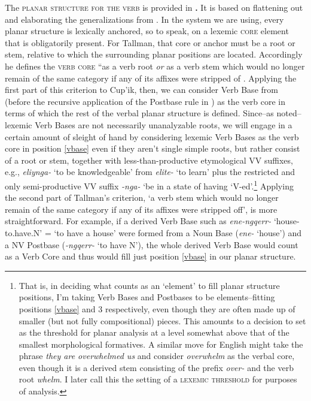 \documentclass[output=paper]{langscibook}
\begin{document}
The \textsc{planar} \textsc{structure} \textsc{for} \textsc{the} \textsc{verb} is provided in \textbf{.} It is based on flattening out and elaborating the generalizations from . In the system we are using, every planar structure is lexically anchored, so to speak, on a lexemic \textsc{core} element that is obligatorily present. For Tallman, that core or anchor must be a root or stem, relative to which the surrounding planar positions are located. Accordingly he defines the \textsc{verb} \textsc{core} ``as a verb root \textit{or} as a verb stem which would no longer remain of the same category if any of its affixes were stripped of \citep[13]{Tallman2021}. Applying the first part of this criterion to Cup'ik, then, we can consider Verb Base from  (before the recursive application of the Postbase rule in ) as the verb core in terms of which the rest of the verbal planar structure is defined. Since--as noted--lexemic Verb Bases are not necessarily unanalyzable roots, we will engage in a certain amount of sleight of hand by considering lexemic Verb Bases as the verb core in position \ref{vbase} even if they aren't single simple roots, but rather consist of a root or stem, together with less-than-productive etymological VV suffixes, e.g., \textit{eliynga-} `to be knowledgeable' from \textit{elite-} `to learn' plus the restricted and only semi-productive VV suffix \textit{{}-nga-} `be in a state of having `V-ed'.\footnote{That is, in deciding what counts as an `element' to fill planar structure positions, I'm taking Verb Bases and Postbases to be elements--fitting positions \ref{vbase} and 3 respectively, even though they are often made up of smaller (but not fully compositional) pieces. This amounts to a decision to set as the threshold for planar analysis at a level somewhat above that of the smallest morphological formatives. A similar move for English might take the phrase \textit{they are overwhelmed us} and consider \textit{overwhelm} as the verbal core, even though it is a derived stem consisting of the prefix \textit{over-} and the verb root \textit{whelm}. I later call this the setting of a \textsc{lexemic} \textsc{threshold} for purposes of analysis.} Applying the second part of Tallman's criterion, `a verb stem which would no longer remain of the same category if any of its affixes were stripped off', is more straightforward. For example, if a derived Verb Base such as \textit{ene-ngqerr-} `house-to.have.N' = `to have a house' were formed from a Noun Base (\textit{ene-} `house') and a NV Postbase (\textit{{}-ngqerr-} `to have N'), the whole derived Verb Base would count as a Verb Core and thus would fill just position \ref{vbase} in our planar structure.
\end{document}
